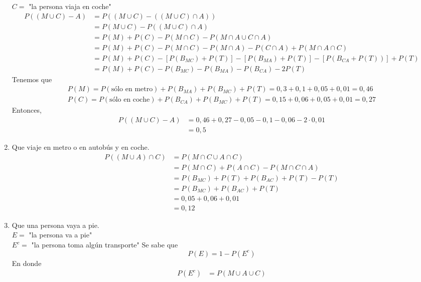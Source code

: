\begin{enumerate}
            $C=$ "la persona viaja en coche"
            \begin{align*}
                P((M\cup C)-A)&=P((M\cup C)-((M\cup C)\cap A))\\
                &=P(M\cup C)-P((M\cup C)\cap A)\\
                &=P(M)+P(C)-P(M\cap C)-P(M\cap A\cup C\cap A)\\
                &=P(M)+P(C)-P(M\cap C)-P(M\cap A)-P(C\cap A)+P(M\cap A\cap C)\\
                &=P(M)+P(C)-[P(B_{MC})+P(T)]-[P(B_{MA})+P(T)]-[P(B_{CA}+P(T))]+P(T)\\
                &=P(M)+P(C)-P(B_{MC})-P(B_{MA})-P(B_{CA})-2P(T)
            \end{align*}
            Tenemos que \begin{align*}
                P(M)=P(\text{sólo en metro})+P(B_{MA})+P(B_{MC})+P(T)=0,3+0,1+0,05+0,01=0,46\\
                P(C)=P(\text{sólo en coche})+P(B_{CA})+P(B_{MC})+P(T)=0,15+0,06+0,05+0,01=0,27
            \end{align*}
            Entonces,\begin{align*}
                P((M\cup C)-A)&=0,46+0,27-0,05-0,1-0,06-2\cdot0,01\\
                &=0,5
            \end{align*}
        \item Que viaje en metro o en autobús y en coche.
            \begin{align*}
                P((M\cup A)\cap C)&=P(M\cap C\cup A\cap C)\\
                &=P(M\cap C)+P(A\cap C)-P(M\cap C\cap A)\\
                &=P(B_{MC})+P(T)+P(B_{AC})+P(T)-P(T)\\
                &=P(B_{MC})+P(B_{AC})+P(T)\\
                &=0,05+0,06+0,01\\
                &=0,12
            \end{align*}
        \item Que una persona vaya a pie.\e\\
            $E=$ "la persona va a pie"\\
            $E^c=$ "la persona toma algún transporte" 
            Se sabe que \[P(E)=1-P(E^c)\]
            En donde \begin{align*}
                P(E^c)&=P(M\cup A\cup C)\\

\end{align*}
\end{enumerate}
